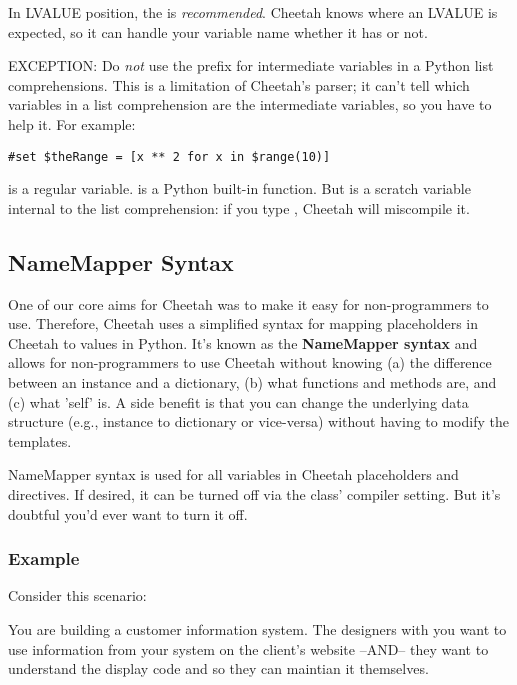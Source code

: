 In LVALUE position, the \code{\$} is {\em recommended}.  Cheetah knows where
an LVALUE is expected, so it can handle your variable name whether it has
\code{\$} or not.

EXCEPTION: Do {\em not} use the \code{\$} prefix for intermediate variables in
a Python list comprehensions.  This is a limitation of Cheetah's parser; it
can't tell which variables in a list comprehension are the intermediate
variables, so you have to help it.  For example:
\begin{verbatim}
#set $theRange = [x ** 2 for x in $range(10)]
\end{verbatim}
 is a regular  variable.   is a
Python built-in function.  But  is a scratch variable internal to
the list comprehension: if you type , Cheetah will miscompile
it.


\subsection{NameMapper Syntax}
\label{language.namemapper}

One of our core aims for Cheetah was to make it easy for non-programmers to
use. Therefore, Cheetah uses a simplified syntax for mapping placeholders
in Cheetah to values in Python. It's known as the {\bf NameMapper syntax}
and allows for non-programmers to use Cheetah without knowing (a) the
difference between an instance and a dictionary, (b) what functions and methods
are, and (c) what 'self' is. A side benefit is that you can change the 
underlying data structure (e.g., instance to dictionary or vice-versa) without
having to modify the templates.

NameMapper syntax is used for all variables in Cheetah placeholders and
directives. If desired, it can be turned off via the  class'
 compiler setting.  But it's doubtful you'd ever want to
turn it off.

\subsubsection{Example}
\label{language.namemapper.example}

Consider this scenario:

You are building a customer information system. The designers with you want to
use information from your system on the client's website --AND-- they want to
understand the display code and so they can maintian it themselves.

